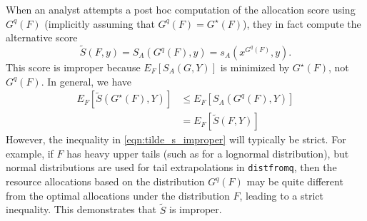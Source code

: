 \documentclass{article}
\begin{document}
When an analyst attempts a post hoc computation of the allocation score using $G^q(F)$ (implicitly assuming that $G^q(F) = G^\star(F)$), they in fact compute the alternative score
$$\tilde{S}(F, y) = S_A(G^q(F), y) = s_A(x^{G^q(F)}, y).$$
This score is improper because $E_{F}[S_A(G, Y)]$ is minimized by $G^\star(F)$, not $G^q(F)$.
In general, we have
\begin{align}
E_{F}[\tilde{S}(G^\star(F), Y)] &\leq E_{F}[ S_A(G^q(F), Y) ] \label{eqn:tilde_s_improper} \\
  &= E_{F}[\tilde{S}(F, Y)] \nonumber
\end{align}
However, the inequality in \eqref{eqn:tilde_s_improper} will typically be strict. For example, if $F$ has heavy upper tails (such as for a lognormal distribution), but normal distributions are used for tail extrapolations in \verb`distfromq`, then the resource allocations based on the distribution $G^q(F)$ may be quite different from the optimal allocations under the distribution $F$, leading to a strict inequality. This demonstrates that $\tilde{S}$ is improper.







\end{document}
